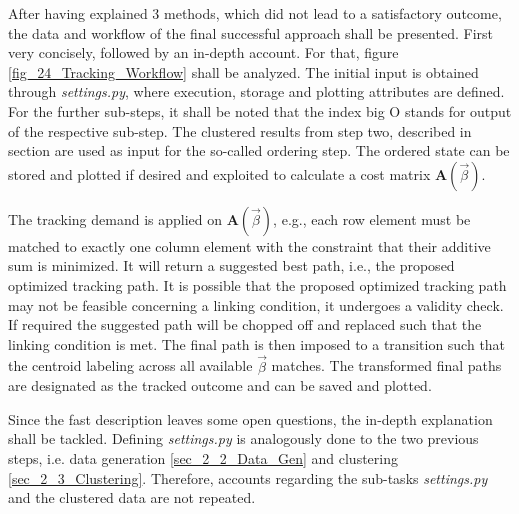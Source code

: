 After having explained 3 methods, which did not lead to a satisfactory outcome, the data and workflow of the final successful approach shall be presented.
First very concisely, followed by an in-depth account.
For that, figure \ref{fig_24_Tracking_Workflow} shall be analyzed.
The initial input is obtained through \emph{settings.py}, where execution, storage and plotting attributes are defined. 
For the further sub-steps, it shall be noted that the index big O stands for output of the respective sub-step.
The clustered results from step two, described in section \cite{sec_2_3_Clustering} are used as input for the so-called ordering step.
The ordered state can be stored and plotted if desired and exploited to calculate a cost matrix $\bm A (\vec{\beta})$. \newline

 \begin{sidewaysfigure} [!]
    \hspace*{-2cm} 
     \resizebox{\textwidth}{!}{
     
}
     \caption{General data and workflow overview of the third step, tracking}
     \label{fig_24_Tracking_Workflow}
 \end{sidewaysfigure}

The tracking demand is applied on $\bm A (\vec{\beta})$, e.g., each row element must be matched to exactly one column element with the constraint that their additive sum is minimized. 
It will return a suggested best path, i.e., the proposed optimized tracking path.
It is possible that the proposed optimized tracking path may not be feasible concerning a linking condition, it undergoes a validity check.
If required the suggested path will be chopped off and replaced such that the linking condition is met. The final path is then imposed to a transition such that the centroid labeling across all available $\vec{\beta}$ matches.
The transformed final paths are designated as the tracked outcome and can be saved and plotted.\newline

Since the fast description leaves some open questions, the in-depth explanation shall be tackled. Defining \emph{settings.py} is 
analogously done to the two previous steps, i.e. data generation \ref{sec_2_2_Data_Gen} and clustering \ref{sec_2_3_Clustering}. 
Therefore, accounts regarding the sub-tasks \emph{settings.py} and the clustered data are not repeated.\newline 

